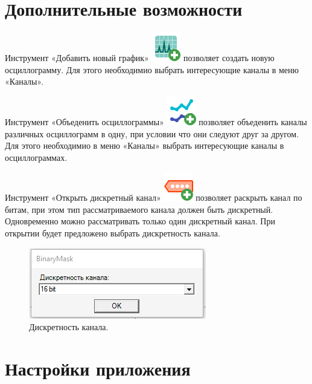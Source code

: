 \documentclass[a4paper,12pt]{article}
\begin{document}
\section*{\hspace{.5cm} Дополнительные возможности}
\hspace{.5cm} Инструмент «Добавить новый график»  \includegraphics[width=4ex]{image/Chromatography.png}  позволяет создать новую осциллограмму. Для этого необходимио выбрать интересующие каналы в меню «Каналы». 

Инструмент «Объеденить осциллограммы»  \includegraphics[width=4ex]{image/Line_Chart.png}  позволяет объеденить каналы различных осциллограмм в одну, при условии что они следуют друг за другом. Для этого необходимио в меню «Каналы» выбрать интересующие каналы в осциллограммах. 

Инструмент «Открыть дискретный канал»  \includegraphics[width=4ex]{image/Dig_Add.png}  позволяет раскрыть канал по битам, при этом тип рассматриваемого канала должен быть дискретный. Одновременно можно рассматривать только один дискретный канал. При открытии будет предложено выбрать дискретность канала.

\begin{figure}[h]
\centering
\includegraphics[width=40ex]{image/BinaryMask.png}
\caption{Дискретность канала.}
\end{figure}

\section*{\hspace{.5cm} Настройки приложения}
\end{document}
